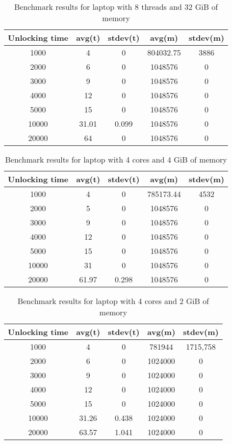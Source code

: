 \documentclass[nolof]{fithesis3}
\begin{document}
\noindent
\begin{table}
\caption{Benchmark results for laptop with 8 threads and 32 GiB of memory}
\label{tab:l8c32g}
\begin{tabularx}{\textwidth}{| c | c | c | c | c |}
\hline
Unlocking time & avg(t) & stdev(t) & avg(m) & stdev(m)\\
\hline
1000 & 4 & 0 & 804032.75 & 3886\\
\hline
2000 & 6 & 0 & 1048576 & 0\\
\hline
3000 & 9 & 0 & 1048576 & 0\\
\hline
4000 & 12 & 0 & 1048576 & 0\\
\hline
5000 & 15 & 0 & 1048576 & 0\\
\hline
10000 & 31.01 & 0.099 & 1048576 & 0\\
\hline
20000 & 64 & 0 & 1048576 & 0\\
\hline
\end{tabularx}
\end{table}

\noindent
\begin{table}
\caption{Benchmark results for laptop with 4 cores and 4 GiB of memory}
\label{tab:l4c4g}
\begin{tabularx}{\textwidth}{| c | c | c | c | c |}
\hline
Unlocking time & avg(t) & stdev(t) & avg(m) & stdev(m)\\
\hline
1000 & 4 & 0 & 785173.44 & 4532\\
\hline
2000 & 5 & 0 & 1048576 & 0\\
\hline
3000 & 9 & 0 & 1048576 & 0\\
\hline
4000 & 12 & 0 & 1048576 & 0\\
\hline
5000 & 15 & 0 & 1048576 & 0\\
\hline
10000 & 31 & 0 & 1048576 & 0\\
\hline
20000 & 61.97 & 0.298 & 1048576 & 0\\
\hline
\end{tabularx}
\end{table}

\noindent
\begin{table}
\caption{Benchmark results for laptop with 4 cores and 2 GiB of memory}
\label{tab:l4c2g}
\begin{tabularx}{\textwidth}{| c | c | c | c | c |}
\hline
Unlocking time & avg(t) & stdev(t) & avg(m) & stdev(m)\\
\hline
1000 & 4 & 0 & 781944 & 1715,758\\
\hline
2000 & 6 & 0 & 1024000 & 0\\
\hline
3000 & 9 & 0 & 1024000 & 0\\
\hline
4000 & 12 & 0 & 1024000 & 0\\
\hline
5000 & 15 & 0 & 1024000 & 0\\
\hline
10000 & 31.26 & 0.438 & 1024000 & 0\\
\hline
20000 & 63.57 & 1.041 & 1024000 & 0\\
\hline
\end{tabularx}
\end{table}
\end{document}
